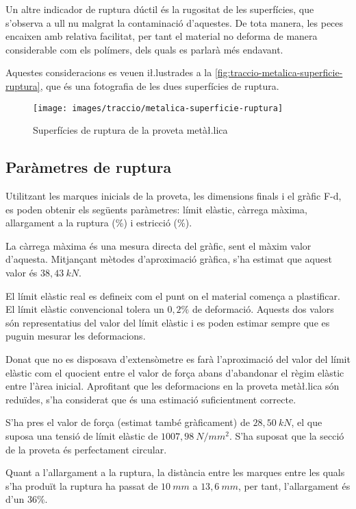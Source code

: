 \documentclass[a4paper]{report}
\begin{document}
Un altre indicador de ruptura dúctil és la rugositat de les superfícies, que s'observa a ull nu malgrat la contaminació d'aquestes. De tota manera, les peces encaixen amb relativa facilitat, per tant el material no deforma de manera considerable com els polímers, dels quals es parlarà més endavant.

Aquestes consideracions es veuen i\l.lustrades a la \autoref{fig:traccio-metalica-superficie-ruptura}, que és una fotografia de les dues superfícies de ruptura. 

\begin{figure}[ht]
    \centering
    \texttt{[image: images/traccio/metalica-superficie-ruptura]}
    \caption{Superfícies de ruptura de la proveta metà\l.lica}
    \label{fig:traccio-metalica-superficie-ruptura}
\end{figure}

\subsection{Paràmetres de ruptura}

Utilitzant les marques inicials de la proveta, les dimensions finals i el gràfic F-d, es poden obtenir els següents paràmetres: límit elàstic, càrrega màxima, allargament a la ruptura (\%) i estricció (\%).

La càrrega màxima és una mesura directa del gràfic, sent el màxim valor d'aquesta. Mitjançant mètodes d'aproximació gràfica, s'ha estimat que aquest valor és $38,43 \ kN$.

El límit elàstic real es defineix com el punt on el material comença a plastificar. El límit elàstic convencional tolera un $0,2\%$ de deformació. Aquests dos valors són representatius del valor del límit elàstic i es poden estimar sempre que es puguin mesurar les deformacions. 

Donat que no es disposava d'extensòmetre es farà l'aproximació del valor del límit elàstic com el quocient entre el valor de força abans d'abandonar el règim elàstic entre l'àrea inicial. Aprofitant que les deformacions en la proveta metà\l.lica són reduïdes, s'ha considerat que és una estimació suficientment correcte.

S'ha pres el valor de força (estimat també gràficament) de $28,50 \ kN$, el que suposa una tensió de límit elàstic de $1007,98 \ N/mm^2$. S'ha suposat que la secció de la proveta és perfectament circular.

Quant a l'allargament a la ruptura, la distància entre les marques entre les quals s'ha produït la ruptura ha passat de $10 \ mm$ a $13,6 \ mm$, per tant, l'allargament és d'un $36\%$.
\end{document}
